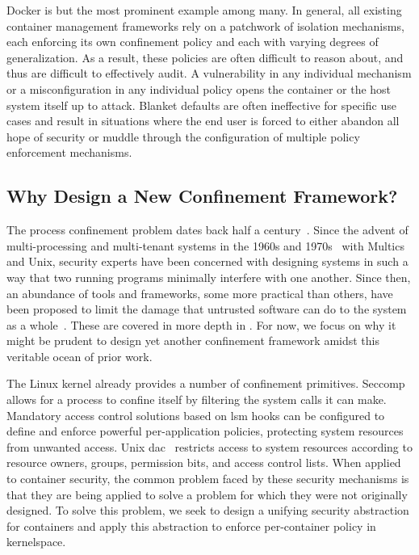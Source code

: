 Docker is but the most prominent example among many. In general, all existing container
management frameworks rely on a patchwork of isolation mechanisms, each enforcing its own
confinement policy and each with varying degrees of generalization. As a result, these
policies are often difficult to reason about, and thus are difficult to effectively audit.
A vulnerability in any individual mechanism or a misconfiguration in any individual policy
opens the container or the host system itself up to attack. Blanket defaults are often
ineffective for specific use cases and result in situations where the end user is forced to
either abandon all hope of security or muddle through the configuration of multiple policy
enforcement mechanisms.

\subsection{Why Design a New Confinement Framework?}%
\label{ss:why-new}

The process confinement problem dates back half a century~\cite{lampson1973_confinement}.
Since the advent of multi-processing and multi-tenant systems in the 1960s and
1970s~\cite{vyssotsky1965_multics, corbato1965_multics, ritchie1974_unix} with Multics and
Unix, security experts have been concerned with designing systems in such a way that two
running programs minimally interfere with one another. Since then, an abundance of tools
and frameworks, some more practical than others, have been proposed to limit the damage
that untrusted software can do to the system as
a whole~\cite{shu2016_security_isolation_study}. These are covered in more depth in
. For now, we focus on why it might be prudent to design yet another
confinement framework amidst this veritable ocean of prior work.

The Linux kernel already provides a number of confinement primitives. Seccomp allows for
a process to confine itself by filtering the system calls it can make. Mandatory access
control solutions based on \gls{lsm} hooks can be configured to define and enforce
powerful per-application policies, protecting system resources from unwanted access. Unix
\gls{dac}~\cite{ritchie1974_unix, van_oorschot2020_tools_jewels, jaeger2008_os_security,
shu2016_security_isolation_study} restricts access to system resources according to
resource owners, groups, permission bits, and access control lists. When applied to
container security, the common problem faced by these security mechanisms is that they are
being applied to solve a problem for which they were not originally designed. To solve
this problem, we seek to design a unifying security abstraction for containers and apply
this abstraction to enforce per-container policy in kernelspace.

